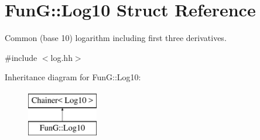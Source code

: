 \hypertarget{structFunG_1_1Log10}{}\section{FunG\+:\+:Log10 Struct Reference}
\label{structFunG_1_1Log10}


Common (base 10) logarithm including first three derivatives.  




{\ttfamily \#include $<$log.\+hh$>$}

Inheritance diagram for FunG\+:\+:Log10\+:\begin{figure}[H]
\begin{center}
\leavevmode
\includegraphics[height=2.000000cm]{structFunG_1_1Log10}
\end{center}
\end{figure}
